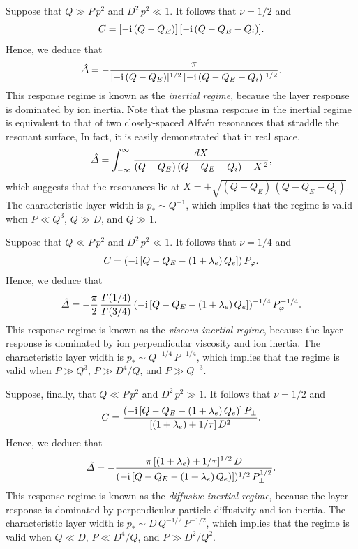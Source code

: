 \documentclass[12pt,prb,aps]{revtex4-1}
\begin{document}
Suppose that $Q\gg P\,p^2$ and $D^2\,p^2 \ll 1$. It follows that $\nu=1/2$ and
\begin{equation}
C = [-{\rm i}\,(Q-Q_E)]\,[-{\rm i}\,(Q-Q_E-Q_i)].
\end{equation}
Hence, we deduce that
\begin{equation}
\hat{\mit\Delta} = -\frac{\pi}{[-{\rm i}\,(Q-Q_E)]^{1/2}\,[-{\rm i}\,(Q-Q_E-Q_i)]^{1/2}}.
\end{equation}
This response regime is known as the {\em inertial regime}, because the layer response is dominated by
 ion inertia.\cite{ara,rf1993} Note that the plasma response in the inertial regime is
 equivalent to that of two closely-spaced Alfv\'{e}n resonances that straddle the resonant surface,\cite{boozer} 
 In fact, it is easily demonstrated that in real space,
 \begin{equation}
 \hat{\mit\Delta} = \int_{-\infty}^\infty \frac{dX}{(Q-Q_E)\,(Q-Q_E-Q_i)-X^{\,2}},
 \end{equation}
 which suggests that the resonances lie at $X=\pm \sqrt{(Q-Q_E)\,(Q-Q_E-Q_i)}$. 
 The characteristic layer width is $p_\ast \sim Q^{-1}$,
which implies that the regime is valid when $P\ll Q^3$, $Q\gg D$, and $Q\gg 1$. 

Suppose that $Q\ll P\,p^2$ and $D^2\,p^2 \ll 1$. It follows that $\nu=1/4$ and
\begin{equation}
C = (-{\rm i}\,[Q-Q_E-(1+\lambda_e)\,Q_e])\,P_\varphi.
\end{equation}
Hence, we deduce that
\begin{equation}
\hat{\mit\Delta} =- \frac{\pi}{2}\,\frac{{\mit\Gamma}(1/4)}{{\mit\Gamma}(3/4)}\, (-{\rm i}\,[Q-Q_E-(1+\lambda_e)\,Q_e])^{-1/4}\,P_\varphi^{-1/4}.
\end{equation}
This response regime is known as the {\em viscous-inertial regime}, because the layer response is dominated by
ion perpendicular viscosity and ion inertia.\cite{rf1998} 
 The characteristic layer width is $p_\ast \sim Q^{-1/4}\,P^{-1/4}$,
which implies that the regime is valid when $P\gg Q^3$, $P\gg D^4/Q$, and $P\gg Q^{-3}$. 

Suppose, finally, that $Q\ll P\,p^2$ and $D^2\,p^2\gg 1$. It follows that $\nu=1/2$ and
\begin{equation}
C = \frac{(-{\rm i}\,[Q-Q_E-(1+\lambda_e)\,Q_e)]\,P_\perp}{[(1+\lambda_e)+1/\tau]\,D^2}.
\end{equation}
Hence, we deduce that
\begin{equation}
\hat{\mit\Delta}= -\frac{\pi\,[(1+\lambda_e)+1/\tau]^{1/2}\,D}{(-{\rm i}\,[Q-Q_E-(1+\lambda_e)\,Q_e)])^{1/2}\,P_\perp^{1/2}}.
\end{equation}
This response regime is known as the {\em diffusive-inertial regime},  because the
layer response is dominated by perpendicular particle diffusivity and ion inertia. The characteristic layer width is $p_\ast\sim
D\,Q^{-1/2}\,P^{-1/2}$, which implies that the regime is valid when $Q\ll D$, $P\ll D^4/Q$, and $P\gg D^2/Q^2$. 
\end{document}
